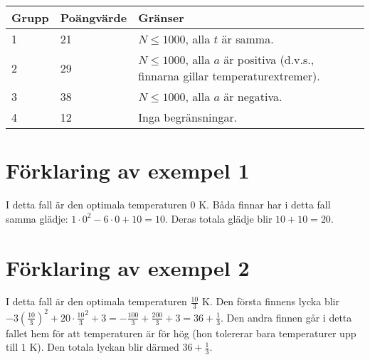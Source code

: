 \noindent
\begin{tabular}{| l | l | l |}
\hline
Grupp & Poängvärde & Gränser \\ \hline
1     & 21         & $N \le 1000$, alla $t$ är samma. \\ \hline
2     & 29         & $N \le 1000$, alla $a$ är positiva (d.v.s., finnarna gillar temperaturextremer). \\ \hline
3     & 38         & $N \le 1000$, alla $a$ är negativa. \\ \hline
4     & 12         & Inga begränsningar. \\ \hline
\end{tabular}

\section*{Förklaring av exempel 1}
I detta fall är den optimala temperaturen $0 \textrm{ K}$.
Båda finnar har i detta fall samma glädje: $1 \cdot 0^2 -6\cdot 0  + 10 = 10$.
Deras totala glädje blir $10 + 10 = 20$.

\section*{Förklaring av exempel 2}
I detta fall är den optimala temperaturen $\frac{10}{3} \textrm{ K}$.
Den första finnens lycka blir $-3(\frac{10}{3})^2 + 20 \cdot \frac{10}{3}^2 + 3 = -\frac{100}{3} + \frac{200}{3} + 3 = 36 + \frac{1}{3}$.
Den andra finnen går i detta fallet hem för att temperaturen är för hög (hon tolererar bara temperaturer upp till $1\textrm{ K}$).
Den totala lyckan blir därmed $36 + \frac{1}{3}$.
